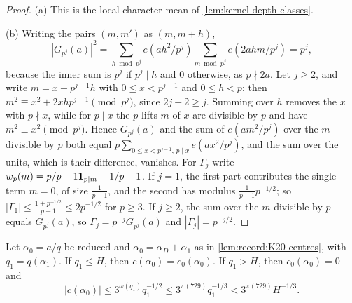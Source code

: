 \begin{proof}
(a) This is the local character mean of \cref{lem:kernel-depth-classes}.

(b) Writing the pairs $(m,m')$ as $(m,m+h)$,
\[
 |G_{p^j}(a)|^2=\sum_{h\bmod p^j}e(ah^2/p^j)\sum_{m\bmod p^j}e(2ahm/p^j)=p^j,
\]
because the inner sum is $p^j$ if $p^j\mid h$ and $0$ otherwise, as
$p\nmid2a$. Let $j\ge2$, and write $m=x+p^{j-1}h$ with $0\le x<p^{j-1}$ and
$0\le h<p$; then $m^2\equiv x^2+2xhp^{j-1}\pmod{p^j}$, since $2j-2\ge j$.
Summing over $h$ removes the $x$ with $p\nmid x$, while for $p\mid x$ the $p$
lifts $m$ of $x$ are divisible by $p$ and have $m^2\equiv x^2\pmod{p^j}$. Hence
$G_{p^j}(a)$ and the sum of $e(am^2/p^j)$ over the $m$ divisible by $p$ both
equal $p\sum_{0\le x<p^{j-1},\,p\mid x}e(ax^2/p^j)$, and the sum over the
units, which is their difference, vanishes. For $\Gamma_j$ write
$w_p(m)=p/p-1\mathbf 1_{p\mid m}-1/p-1$. If $j=1$, the first part
contributes the single term $m=0$, of size $\frac1{p-1}$, and the second has
modulus $\frac1{p-1}p^{-1/2}$; so $|\Gamma_1|\le\frac{1+p^{-1/2}}{p-1}\le2p^{-1/2}$
for $p\ge3$. If $j\ge2$, the sum over the $m$ divisible by $p$ equals
$G_{p^j}(a)$, so $\Gamma_j=p^{-j}G_{p^j}(a)$ and $|\Gamma_j|=p^{-j/2}$.
\end{proof}

\begin{lemma}\label{lem:record:kernel-coefficient}
Let $\alpha_0=a/q$ be reduced and $\alpha_0=\alpha_D+\alpha_1$ as in
\cref{lem:record:K20-centres}, with $q_1=q(\alpha_1)$. If $q_1\le H$, then
$c(\alpha_0)=c_0(\alpha_0)$. If $q_1>H$, then $c_0(\alpha_0)=0$ and
\[
 |c(\alpha_0)|\le3^{\omega(q_1)}q_1^{-1/2}\le3^{\pi(729)}q_1^{-1/3}
 <3^{\pi(729)}H^{-1/3}.
\]
\end{lemma}

